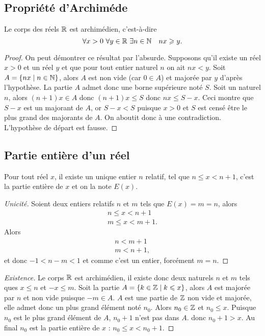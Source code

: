 \subsection{Propriété d'Archiméde}
\begin{prop}
  Le corps des réels \(\mathbb{R}\) est archimédien, c'est-à-dire
  \begin{equation}
    \forall x>0 \ \forall y\in \R \ \exists n\in \N \quad nx\geqslant y.
  \end{equation}
\end{prop}
\begin{proof}
  On peut démontrer ce résultat par l'absurde. Supposons qu'il existe un réel \(x>0\) et un réel \(y\) et que pour tout entier naturel \(n\) on ait \(nx<y\). Soit \(A=\left\{nx\mathrel{}\middle|\mathrel{}n\in \mathbb{N}\right\}\), alors \(A\) est non vide (car \(0\in A\)) et majorée par \(y\) d'après l'hypothèse. La partie \(A\) admet donc une borne supérieure noté \(S\). Soit un naturel \(n\), alors \((n+1)x \in A\) donc \((n+1)x\leqslant S\) donc \(nx \leqslant S-x\). Ceci montre que \(S-x\) est un majorant de \(A\), or \(S-x<S\) puisque \(x>0\) et \(S\) est censé être le plus grand des majorants de \(A\). On aboutit donc à une contradiction. L'hypothèse de départ est fausse.
\end{proof}

\subsection{Partie entière d'un réel}

\begin{prop}
  Pour tout réel \(x\), il existe un unique entier \(n\) relatif, tel que \(n\leqslant x<n+1\), c'est la partie entière de \(x\) et on la note \(E(x)\).
\end{prop}
\begin{proof}[Unicité]
  Soient deux entiers relatifs \(n\) et \(m\) tels que \(E(x)=m=n\), alors
  \begin{align}
    n\leqslant x< n+1 \\  m\leqslant x< m+1.
  \end{align}
  Alors
  \begin{align}
    n<m+1 \\  m<n+1,
  \end{align}
  et donc \(-1<n-m<1\) et comme c'est un entier, forcément \(m=n\).
\end{proof}
\begin{proof}[Existence]
  Le corps \(\mathbb{R}\) est archimédien, il existe donc deux naturels \(n\) et \(m\) tels ques \(x\leqslant n\) et  \(-x\leqslant m\). Soit la partie \(A=\left\{k \in \mathbb{Z}\mathrel{}\middle|\mathrel{}k\leqslant x\right\}\), alors \(A\) est majorée par \(n\) et non vide puisque \(-m\in A\). \(A\) est une partie de \(\mathbb{Z}\) non vide et majorée, elle admet donc un plus grand élément noté \(n_0\). Alors \(n_0\in \mathbb{Z}\) et \(n_0\leqslant x\). Puisque \(n_0\) est le plus grand élément de \(A\), \(n_0+1\) n'est pas dans \(A\). donc \(n_0+1>x\). Au final \(n_0\) est la partie entière de \(x\) : \(n_0\leqslant x<n_0+1\).
\end{proof}


